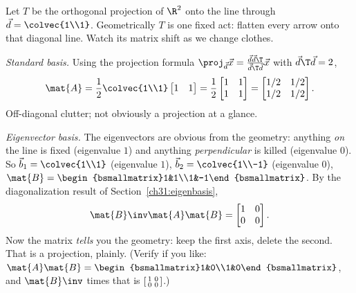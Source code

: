 \begin{example}
\label{ch31:ex-capstone}
Let $T$ be the orthogonal projection of $\R^2$ onto the line through
$\vec{d}=\colvec{1\\1}$. Geometrically $T$ is one fixed act: flatten every arrow
onto that diagonal line. Watch its matrix shift as we change clothes.

\emph{Standard basis.} Using the projection formula
$\proj_{\vec{d}}\vec{x}=\frac{\vec{d}\vec{d}\T}{\vec{d}\T\vec{d}}\vec{x}$ with
$\vec{d}\T\vec{d}=2$,
\[
  \mat{A} = \frac12\colvec{1\\1}\begin{bmatrix}1&1\end{bmatrix}
  = \frac12\begin{bmatrix}1&1\\1&1\end{bmatrix}
  = \begin{bmatrix}1/2&1/2\\1/2&1/2\end{bmatrix}.
\]
Off-diagonal clutter; not obviously a projection at a glance.

\emph{Eigenvector basis.} The eigenvectors are obvious from the geometry: anything
\emph{on} the line is fixed (eigenvalue $1$) and anything \emph{perpendicular} is
killed (eigenvalue $0$). So $\vec{b}_1=\colvec{1\\1}$ (eigenvalue $1$),
$\vec{b}_2=\colvec{1\\-1}$ (eigenvalue $0$), $\mat{B}=\begin{bsmallmatrix}1&1\\1&-1\end{bsmallmatrix}$.
By the diagonalization result of Section~\ref{ch31:eigenbasis},
\[
  \mat{B}\inv\mat{A}\mat{B} = \begin{bmatrix}1&0\\0&0\end{bmatrix}.
\]
Now the matrix \emph{tells} you the geometry: keep the first axis, delete the
second. That is a projection, plainly. (Verify if you like: $\mat{A}\mat{B}
=\begin{bsmallmatrix}1&0\\1&0\end{bsmallmatrix}$, and $\mat{B}\inv$ times that is
$\begin{bsmallmatrix}1&0\\0&0\end{bsmallmatrix}$.)


\end{example}
